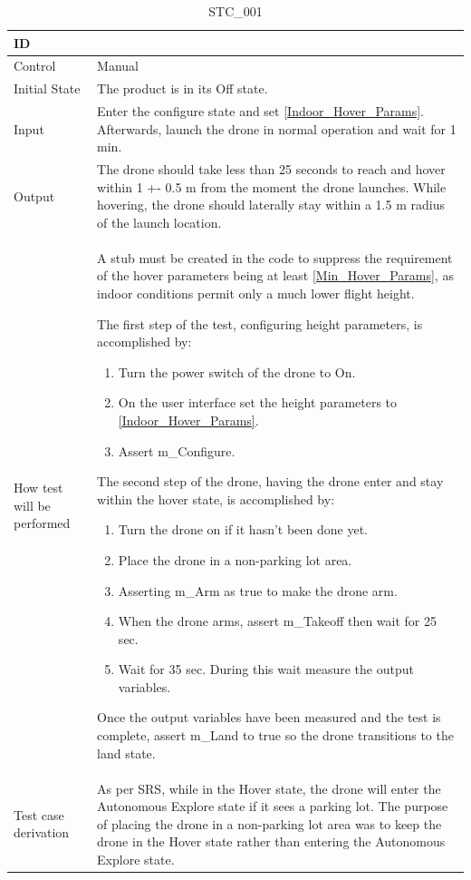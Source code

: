 \documentclass[12pt, titlepage]{article}
\begin{document}
\begin{table}[!h]
\begin{center}
\caption {STC\_001}
\label{tab:STC_001}
\begin{tabular}{ | m{1.5cm} | m{15cm} | } 
\hline
ID & \nameref{tab:STC_001} \\ 
\hline
Control & Manual \\ 
\hline
Initial State & The product is in its Off state. \\ 
\hline
Input & Enter the configure state and set \ref{Indoor_Hover_Params}. Afterwards, launch the drone in normal operation and wait for 1 min. \\ 
\hline
Output & The drone should take less than 25 seconds to reach and hover within 1 +- 0.5 m from the moment the drone launches. While hovering, the drone should laterally stay within a 1.5 m radius of the launch location. \\ 
\hline
How test will be performed & A stub must be created in the code to suppress the requirement of the hover parameters being at least \ref{Min_Hover_Params}, as indoor conditions permit only a much lower flight height. 

The first step of the test, configuring height parameters, is accomplished by:
\begin{enumerate}[topsep=0pt,itemsep=-1ex,partopsep=1ex,parsep=1ex]
    \item Turn the power switch of the drone to On.
    \item  On the user interface set the height parameters to \ref{Indoor_Hover_Params}.
    \item Assert m\_Configure.
\end{enumerate}
The second step of the drone, having the drone enter and stay within the hover state, is accomplished by:
\begin{enumerate}[topsep=0pt,itemsep=-1ex,partopsep=1ex,parsep=1ex]
	\item Turn the drone on if it hasn't been done yet. 
	\item Place the drone in a non-parking lot area. 
	\item Asserting m\_Arm as true to make the drone arm.
        \item When the drone arms, assert m\_Takeoff then wait for 25 sec.
	\item Wait for 35 sec. During this wait measure the output variables.
\end{enumerate}
Once the output variables have been measured and the test is complete, assert m_Land to true so the drone transitions to the land state.\\ 
\hline
Test case derivation & As per SRS, while in the Hover state, the drone will enter the Autonomous Explore state if it sees a parking lot. The purpose of placing the drone in a non-parking lot area was to keep the drone in the Hover state rather than entering the Autonomous Explore state.


\end{tabular}
\end{center}
\end{table}
\end{document}
